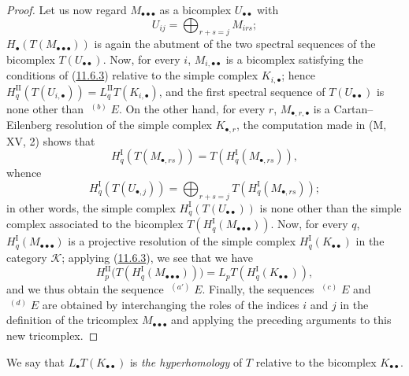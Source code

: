 \begin{proof}
Let us now regard $M_{\bullet\bullet\bullet}$ as a bicomplex
$U_{\bullet\bullet}$ with
\[
U_{ij}=\bigoplus_{r+s=j}M_{irs};
\]
$H_\bullet(T(M_{\bullet\bullet\bullet}))$ is again the abutment of the two
spectral sequences of the bicomplex $T(U_{\bullet\bullet})$. Now, for every $i$,
$M_{i,\bullet\bullet}$ is a bicomplex satisfying the conditions of
(\hyperref[0.11.6.3]{11.6.3}) relative to the simple complex
$K_{i,\bullet}$; hence
$H_q^{\mathrm{II}}(T(U_{i,\bullet}))=
L_q^{\mathrm{II}}T(K_{i,\bullet})$, and the first spectral sequence of
$T(U_{\bullet\bullet})$ is none other than $\mathop{}^{(b)}E$. On the other
hand, for every $r$, $M_{\bullet,r,\bullet}$ is a Cartan--Eilenberg resolution
of the simple complex $K_{\bullet,r}$, the computation made in (M, XV, 2)
shows that
\[
H_q^{\mathrm I}(T(M_{\bullet,rs}))
=T(H_q^{\mathrm I}(M_{\bullet,rs})),
\]
whence
\[
H_q^{\mathrm I}(T(U_{\bullet,j}))
=\bigoplus_{r+s=j}T(H_q^{\mathrm I}(M_{\bullet,rs}));
\]
in other words, the simple complex
$H_q^{\mathrm I}(T(U_{\bullet\bullet}))$ is none other than the simple complex
associated to the bicomplex
$T(H_q^{\mathrm I}(M_{\bullet\bullet\bullet}))$. Now, for every $q$,
$H_q^{\mathrm I}(M_{\bullet\bullet\bullet})$ is a projective resolution of the
simple complex $H_q^{\mathrm I}(K_{\bullet\bullet})$ in the category
$\mathcal K$; applying (\hyperref[0.11.6.3]{11.6.3}), we see that we have
\[
H_p^{\mathrm{II}}
\bigl(T(H_q^{\mathrm I}(M_{\bullet\bullet\bullet}))\bigr)
=L_pT(H_q^{\mathrm I}(K_{\bullet\bullet})),
\]
and we thus obtain the sequence $\mathop{}^{(a')}E$. Finally, the sequences
$\mathop{}^{(c)}E$ and $\mathop{}^{(d)}E$ are obtained by interchanging the
roles of the indices $i$ and $j$ in the definition of the tricomplex
$M_{\bullet\bullet\bullet}$ and applying the preceding arguments to this new
tricomplex.
\end{proof}

We say that $L_\bullet T(K_{\bullet\bullet})$ is \emph{the hyperhomology} of
$T$ relative to the bicomplex $K_{\bullet\bullet}$.


